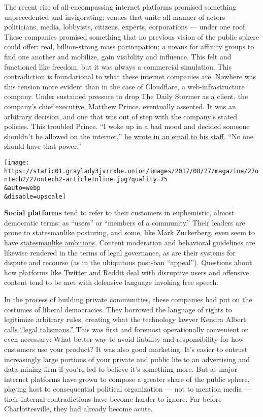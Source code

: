 The recent rise of all-encompassing internet platforms promised
something unprecedented and invigorating: venues that unite all manner
of actors --- politicians, media, lobbyists, citizens, experts,
corporations --- under one roof. These companies promised something that
no previous vision of the public sphere could offer: real,
billion-strong mass participation; a means for affinity groups to find
one another and mobilize, gain visibility and influence. This felt and
functioned like freedom, but it was always a commercial simulation. This
contradiction is foundational to what these internet companies are.
Nowhere was this tension more evident than in the case of Cloudflare, a
web-infrastructure company. Under sustained pressure to drop The Daily
Stormer as a client, the company's chief executive, Matthew Prince,
eventually assented. It was an arbitrary decision, and one that was out
of step with the company's stated policies. This troubled Prince. ``I
woke up in a bad mood and decided someone shouldn't be allowed on the
internet,''
\href{http://gizmodo.com/cloudflare-ceo-on-terminating-service-to-neo-nazi-site-1797915295}{he
wrote in an email to his staff}. ``No one should have that power.''

\texttt{[image: https://static01.graylady3jvrrxbe.onion/images/2017/08/27/magazine/27ontech2/27ontech2-articleInline.jpg?quality=75\\\&auto=webp\\\&disable=upscale]}

\textbf{Social platforms} tend to refer to their customers in
euphemistic, almost democratic terms: as ``users'' or ``members of a
community.'' Their leaders are prone to statesmanlike posturing, and
some, like Mark Zuckerberg, even seem to have
\href{https://www.wired.com/story/mark-zuckerberg-america-travels/}{statesmanlike
ambitions}. Content moderation and behavioral guidelines are likewise
rendered in the terms of legal governance, as are their systems for
dispute and recourse (as in the ubiquitous post-ban ``appeal'').
Questions about how platforms like Twitter and Reddit deal with
disruptive users and offensive content tend to be met with defensive
language invoking free speech.

In the process of building private communities, these companies had put
on the costumes of liberal democracies. They borrowed the language of
rights to legitimize arbitrary rules, creating what the technology
lawyer Kendra Albert
\href{https://cyber.harvard.edu/events/luncheons/2016/10/Albert}{calls
``legal talismans.''} This was first and foremost operationally
convenient or even necessary: What better way to avoid liability and
responsibility for how customers use your product? It was also good
marketing. It's easier to entrust increasingly large portions of your
private and public life to an advertising and data-mining firm if you're
led to believe it's something more. But as major internet platforms have
grown to compose a greater share of the public sphere, playing host to
consequential political organization --- not to mention media --- their
internal contradictions have become harder to ignore. Far before
Charlottesville, they had already become acute.

